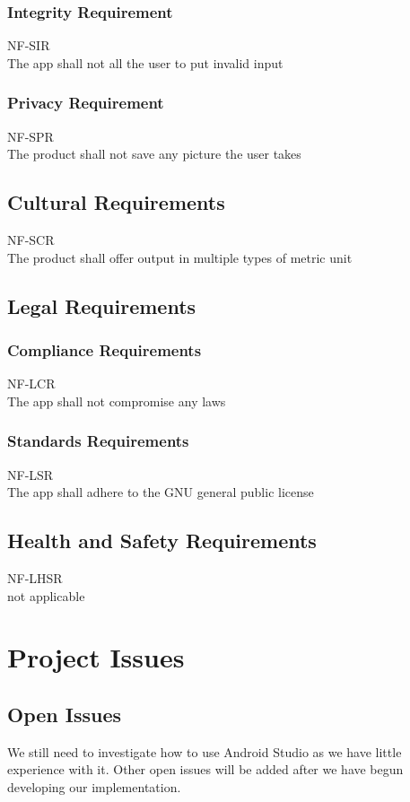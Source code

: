 \documentclass[12pt, titlepage]{article}
\begin{document}
\subsubsection{Integrity Requirement}
NF-SIR \\
The app shall not all the user to put invalid input

\subsubsection{Privacy Requirement}
NF-SPR \\
The product shall not save any picture the user takes

\subsection{Cultural Requirements}
NF-SCR \\
The product shall offer output in multiple  types of metric unit

\subsection{Legal Requirements}
\subsubsection{Compliance Requirements}
NF-LCR \\
The app shall not compromise any laws 

\subsubsection{Standards Requirements}
NF-LSR \\
The app shall adhere to the GNU general public license 

\subsection{Health and Safety Requirements}
NF-LHSR \\
not applicable 

\section{Project Issues}

\subsection{Open Issues}
We still need to investigate how to use Android Studio as we have little experience with it. Other open issues will be added after we have begun developing our implementation.
\end{document}
